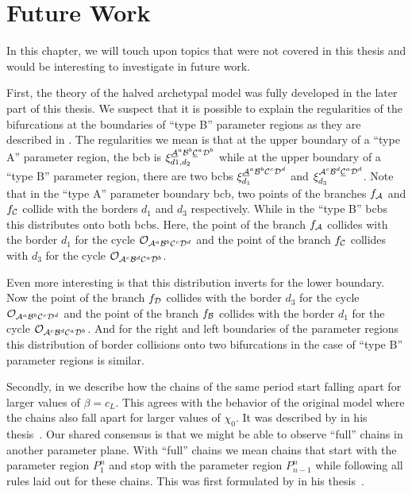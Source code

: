 \chapter{Future Work}
\label{chap:outlook}


In this chapter, we will touch upon topics that were not covered in this thesis and would be interesting to investigate in future work.

First, the theory of the halved archetypal model was fully developed in the later part of this thesis.
We suspect that it is possible to explain the regularities of the bifurcations at the boundaries of ``type B'' parameter regions as they are described in .
The regularities we mean is that at the upper boundary of a ``type A'' parameter region, the \gls{bcb} is $\xi_{d1, d_2}^{\underline{\mathcal{A}}^a\mathcal{B}^b\underline{\mathcal{C}}^a\mathcal{D}^b}$ while at the upper boundary of a ``type B'' parameter region, there are two \glspl{bcb} $\xi_{d_1}^{\underline{\mathcal{A}}^a\mathcal{B}^b\mathcal{C}^c\mathcal{D}^d}$ and $\xi_{d_3}^{\mathcal{A}^c\mathcal{B}^d\underline{\mathcal{C}}^a\mathcal{D}^d}$.
Note that in the ``type A'' parameter boundary \gls{bcb}, two points of the branches $f_{\mathcal{A}}$ and $f_{\mathcal{C}}$ collide with the borders $d_1$ and $d_3$ respectively.
While in the ``type B'' \glspl{bcb} this distributes onto both \glspl{bcb}.
Here, the point of the branch $f_{\mathcal{A}}$ collides with the border $d_1$ for the cycle $\mathcal{O}_{\mathcal{A}^a\mathcal{B}^b\mathcal{C}^c\mathcal{D}^d}$ and the point of the branch $f_{\mathcal{C}}$ collides with $d_3$ for the cycle $\mathcal{O}_{\mathcal{A}^c\mathcal{B}^d\mathcal{C}^a\mathcal{D}^b}$.

Even more interesting is that this distribution inverts for the lower boundary.
Now the point of the branch $f_{\mathcal{D}}$ collides with the border $d_3$ for the cycle $\mathcal{O}_{\mathcal{A}^a\mathcal{B}^b\mathcal{C}^c\mathcal{D}^d}$ and the point of the branch $f_{\mathcal{B}}$ collides with the border $d_1$ for the cycle $\mathcal{O}_{\mathcal{A}^c\mathcal{B}^d\mathcal{C}^a\mathcal{D}^b}$.
And for the right and left boundaries of the parameter regions this distribution of border collisions onto two bifurcations in the case of ``type B'' parameter regions is similar.

Secondly, in  we describe how the chains of the same period start falling apart for larger values of $\beta = c_L$.
This agrees with the behavior of the original model where the chains also fall apart for larger values of $\chi_0$.
It was described by  in his thesis~\cite{akyuz2022}.
Our shared consensus is that we might be able to observe ``full'' chains in another parameter plane.
With ``full'' chains we mean chains that start with the parameter region $P^{n}_{1}$ and stop with the parameter region $P^{n}_{n-1}$ while following all rules laid out for these chains.
This was first formulated by  in his thesis~\cite{akyuz2022}.

